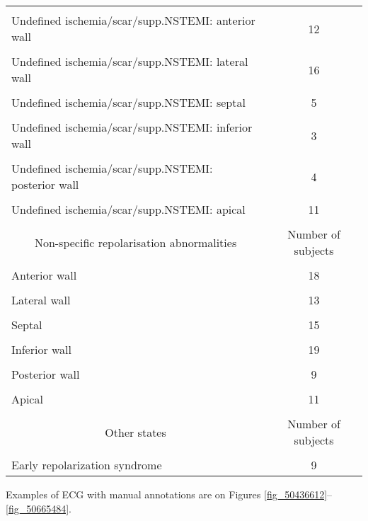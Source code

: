 \documentclass[submitted]{ieeeaccess}
\newcommand{\NewCorrection}[1]{{#1}}
\begin{document}
\begin{table}
\begin{adjustbox}{width=1\linewidth}
\begin{tabular}{|l|c|}
			\hline
			&\\[-1em]
			Undefined ischemia/scar/supp.NSTEMI: anterior wall & 12 \\
			\hline
			&\\[-1em]
			Undefined ischemia/scar/supp.NSTEMI: lateral wall & 16 \\
			\hline
			&\\[-1em]
			Undefined ischemia/scar/supp.NSTEMI: septal & 5 \\
			\hline
			&\\[-1em]
			Undefined ischemia/scar/supp.NSTEMI: inferior wall & 3 \\
			\hline
			&\\[-1em]
			Undefined ischemia/scar/supp.NSTEMI: posterior wall & 4 \\
			\hline
			&\\[-1em]
			Undefined ischemia/scar/supp.NSTEMI: apical & 11 \\
			\hline
			&\\[-1em]
			\multicolumn{1}{c|}{Non-specific repolarisation abnormalities} &{Number of subjects} \\
			\hline
			&\\[-1em]
			Anterior wall & 18 \\
			\hline
			&\\[-1em]
			Lateral wall & 13 \\
			\hline
			&\\[-1em]
			Septal & 15 \\
			\hline
			&\\[-1em]
			Inferior wall & 19 \\
			\hline
			&\\[-1em]
			Posterior wall & 9 \\
			\hline
			&\\[-1em]
			Apical & 11 \\
			\hline
			&\\[-1em]
			\multicolumn{1}{c|}{Other states} &{Number of subjects} \\
			\hline
			&\\[-1em]
			Early repolarization syndrome & 9 \\
			\hline
		\end{tabular}
        \end{adjustbox}
		\label{table5}
\end{table}


\NewCorrection{Examples of ECG with manual annotations are on Figures \ref{fig_50436612}--\ref{fig_50665484}.}
\end{document}
